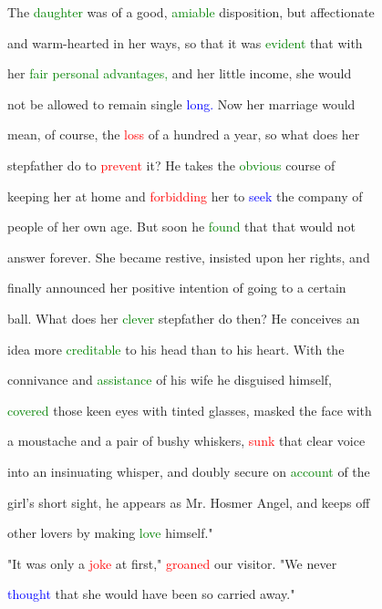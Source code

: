 The \textcolor{green}{daughter} was of a \textcolor{BurntOrange}{good,} \textcolor{green}{amiable} disposition, but affectionate

 and warm-hearted in her ways, so that it was \textcolor{green}{evident} that with

 her \textcolor{green}{fair} \textcolor{green}{personal} \textcolor{green}{advantages,} and her little \textcolor{BurntOrange}{income,} she would

 not be allowed to remain single \textcolor{blue}{long.} Now her \textcolor{BurntOrange}{marriage} would

 mean, of course, the \textcolor{red}{loss} of a hundred a year, so what does her

 stepfather do to \textcolor{red}{prevent} it? He takes the \textcolor{green}{obvious} course of

 keeping her at home and \textcolor{red}{forbidding} her to \textcolor{blue}{seek} the company of

 people of her own age. But soon he \textcolor{green}{found} that that would not

 answer forever. She became restive, insisted upon her rights, and

 \textcolor{BurntOrange}{finally} announced her positive intention of going to a certain

 ball. What does her \textcolor{green}{clever} stepfather do then? He conceives an

 idea more \textcolor{green}{creditable} to his head than to his heart. With the

 connivance and \textcolor{green}{assistance} of his wife he disguised himself,

 \textcolor{green}{covered} those keen eyes with tinted glasses, masked the face with

 a moustache and a pair of bushy whiskers, \textcolor{red}{sunk} that clear voice

 into an insinuating whisper, and doubly secure on \textcolor{green}{account} of the

 girl's short sight, he appears as Mr. Hosmer \textcolor{BurntOrange}{Angel,} and keeps off

 other \textcolor{BurntOrange}{lovers} by making \textcolor{green}{love} himself."



 "It was only a \textcolor{red}{joke} at first," \textcolor{red}{groaned} our \textcolor{BurntOrange}{visitor.} "We never

 \textcolor{blue}{thought} that she would have been so carried away."



